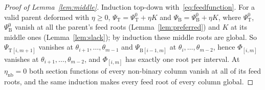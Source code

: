 \documentclass[11pt,a4paper]{report}
\newcommand{\Ts}{\mathrm T}
\newcommand{\Bs}{\mathrm B}
\begin{document}
\begin{proof}[Proof of Lemma~\ref{lem:middle}]
Induction top-down with~\eqref{eq:feedfunction}. For a valid parent deformed with \(\eta\ge0\), \(\Psi_\Ts=\Psi^0_\Ts+\eta K\) and
\(\Psi_\Bs=\Psi^0_\Bs+\eta K\), where \(\Psi^0_\Ts\), \(\Psi^0_\Bs\) vanish at all the parent's feed roots (Lemma~\ref{lem:preferred}) and \(K\) at
its middle ones (Lemma~\ref{lem:slack}); by induction these middle roots are global. So \(\Psi_{\Ts[i,m+1]}\) vanishes at
\(\theta_{i+1},\dots,\theta_{m-1}\) and \(\Psi_{\Bs[i-1,m]}\) at \(\theta_i,\dots,\theta_{m-2}\), hence \(\Phi_{[i,m]}\) vanishes at
\(\theta_{i+1},\dots,\theta_{m-2}\), and \(\Phi_{[i,m]}\) has exactly one root per interval. At \(\eta_{\mathrm{nb}}=0\) both section functions of
every non-binary column vanish at all of its feed roots, and the same induction makes every feed root of every column
global.
\end{proof}
\end{document}
